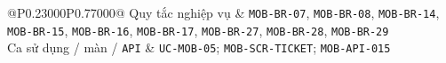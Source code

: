\begin{longtable}{@{}P{0.23000\SRSWidth}P{0.77000\SRSWidth}@{}}
Quy tắc nghiệp vụ & \texttt{MOB-\allowbreak{}BR-\allowbreak{}07}, \texttt{MOB-\allowbreak{}BR-\allowbreak{}08}, \texttt{MOB-\allowbreak{}BR-\allowbreak{}14}, \texttt{MOB-\allowbreak{}BR-\allowbreak{}15}, \texttt{MOB-\allowbreak{}BR-\allowbreak{}16}, \texttt{MOB-\allowbreak{}BR-\allowbreak{}17}, \texttt{MOB-\allowbreak{}BR-\allowbreak{}27}, \texttt{MOB-\allowbreak{}BR-\allowbreak{}28}, \texttt{MOB-\allowbreak{}BR-\allowbreak{}29} \\[3pt]
Ca sử dụng /\allowbreak{} màn /\allowbreak{} \texttt{API} & \texttt{UC-\allowbreak{}MOB-\allowbreak{}05}; \texttt{MOB-\allowbreak{}SCR-\allowbreak{}TICKET}; \texttt{MOB-\allowbreak{}API-\allowbreak{}015} \\[3pt]
\end{longtable}
\endgroup

